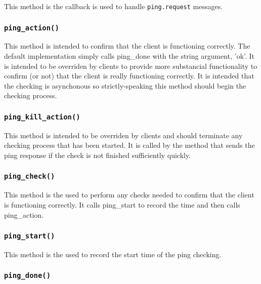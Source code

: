 \documentclass[12pt,a4paper]{article}
\begin{document}
This method is the callback is used to handle \texttt{ping.request} messages.

\subsubsection*{\texttt{ping\_action()}\label{xPL::Client_ping_action_}}


This method is intended to confirm that the client is functioning
correctly.  The default implementation simply calls \textsf{ping\_done} with
the string argument, 'ok'.  It is intended to be overriden by clients
to provide more substancial functionality to confirm (or not) that the
client is really functioning correctly.  It is intended that the
checking is asynchonous so strictly-speaking this method should begin
the checking process.

\subsubsection*{\texttt{ping\_kill\_action()}\label{xPL::Client_ping_kill_action_}}


This method is intended to be overriden by clients and should terminate
any checking process that has been started.  It is called by the method
that sends the ping response if the check is not finished sufficiently
quickly.

\subsubsection*{\texttt{ping\_check()}\label{xPL::Client_ping_check_}}


This method is the used to perform any checks needed to confirm that the
client is functioning correctly.  It calls \textsf{ping\_start} to record the
time and then calls \textsf{ping\_action}.

\subsubsection*{\texttt{ping\_start()}\label{xPL::Client_ping_start_}}


This method is the used to record the start time of the ping checking.

\subsubsection*{\texttt{ping\_done()}\label{xPL::Client_ping_done_}}
\end{document}
